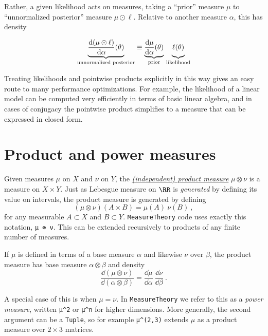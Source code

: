 \documentclass{juliacon}
\begin{document}
Rather, a given likelihood acts on measures, taking a ``prior'' measure $\mu$ to ``unnormalized posterior'' measure $\mu \odot \ell$. Relative to another measure $\alpha$, this has density

\[
    {\underbrace{\frac{\dd(\mu\odot\ell)}{\dd\alpha}(\theta)}_\text{unnormalized posterior}}
    \equiv
    {\underbrace{\frac{\dd\mu}{\dd\alpha}(\theta)}_{\text{prior}}}\ {\underbrace{\vphantom{\frac{\dd(\mu\odot\ell)}{\dd\alpha}(\theta)}\ell(\theta)}_{\text{likelihood}}}
\]

Treating likelihoods and pointwise products explicitly in this way gives an easy route to many performance optimizations. For example, the likelihood of a linear model can be computed very efficiently in terms of basic linear algebra, and in cases of conjugacy the pointwise product simplifies to a measure that can be expressed in closed form.

\section{Product and power measures}

Given measures $\mu$ on $X$ and $\nu$ on $Y$, the \href{https://en.wikipedia.org/wiki/Product_measure}{\emph{(independent) product measure}} $\mu \otimes \nu$ is a measure on $X\times Y$. Just as Lebesgue measure on $\RR$ is \emph{generated} by defining its value on intervals, the product measure is generated by defining
\[
(\mu \otimes \nu)(A\times B) = \mu(A)\ \nu(B)\ ,
\]
for any measurable $A\subset X$ and $B\subset Y$. \verb|MeasureTheory| code uses exactly this notation, \verb|μ ⊗ ν|. This can be extended recursively to products of any finite number of measures.

If $\mu$ is defined in terms of a base measure $\alpha$ and likewise $\nu$ over $\beta$, the product measure has base measure $\alpha \otimes \beta$ and density
\[
\frac{\dd(\mu \otimes \nu)}{\dd(\alpha \otimes \beta)} = \frac{\dd\mu}{\dd\alpha}\ \frac{\dd\nu}{\dd\beta}\ .
\]



A special case of this is when $\mu = \nu$. In \verb|MeasureTheory| we refer to this as a \emph{power measure}, written \verb|μ^2| or \verb|μ^n| for higher dimensions. More generally, the second argument can be a \verb|Tuple|, so for example \verb|μ^(2,3)| extends $\mu$ as a product measure over $2\times 3$ matrices.
\end{document}
